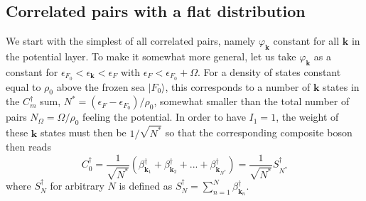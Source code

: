 \documentclass[aps,prb,preprint,groupedaddress,amsmath]{revtex4-1}
\newcommand{\vk}{\ensuremath{\mathbf{k}}}
\newcommand{\dg}{\ensuremath{\dagger}}
\begin{document}
\subsection{Correlated pairs with a flat distribution}
We start with the simplest of all correlated pairs, namely $\varphi_\vk$ constant for all  $\vk$ in the potential layer. To make it somewhat more general, let us take $\varphi_\vk$  as a constant for $\epsilon_{F_0}<\epsilon_\vk<\epsilon_{F}$ with $\epsilon_{F}<\epsilon_{F_0}+\Omega$. For a density of states  constant equal to $\rho_0$ above the frozen sea $|F_0\rangle$, this corresponds to a number of $\vk$ states in the $C_m^\dg$ sum, $N^*=(\epsilon_{F}-\epsilon_{F_0})/\rho_0$, somewhat smaller than the total number of pairs $N_\Omega=\Omega/\rho_0$ feeling the potential.  In order to have $I_1=1$, the weight of these $\vk$ states must then be $1/\sqrt{N^*}$
so that the corresponding composite boson then reads
 \begin{equation}
C^\dg_0=\frac1{\sqrt{N^*}}(\beta^\dg_{\vk_1}+\beta^\dg_{\vk_2}+...+\beta^\dg_{\vk_{N^*}})=\frac1{\sqrt{N^*}}S^\dg_{N^*}
\end{equation}
 where  $S_N^\dg$ for arbitrary $N$ is defined as $S_N^\dg=\sum_{n=1}^N\beta^\dg_{\vk_n}$. 
\end{document}
